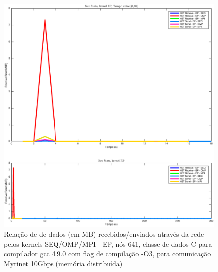 \documentclass[conference,compsoc]{IEEEtran}
\begin{document}
\begin{figure}[H]
\centering
\includegraphics[width=1.1\columnwidth]{EPS/dstat_EP_seq_vs_omp_vs_mpi/net.eps}
\caption{Relação de de dados (em MB) recebidos/enviados através da rede pelos kernels SEQ/OMP/MPI - EP, nós 641, classe de dados C para compilador gcc 4.9.0 com flag de compilação  -O3, para comunicação Myrinet 10Gbps (memória distribuída)}
\label{dstat_ep_SOM_net}
\end{figure}
\end{document}
